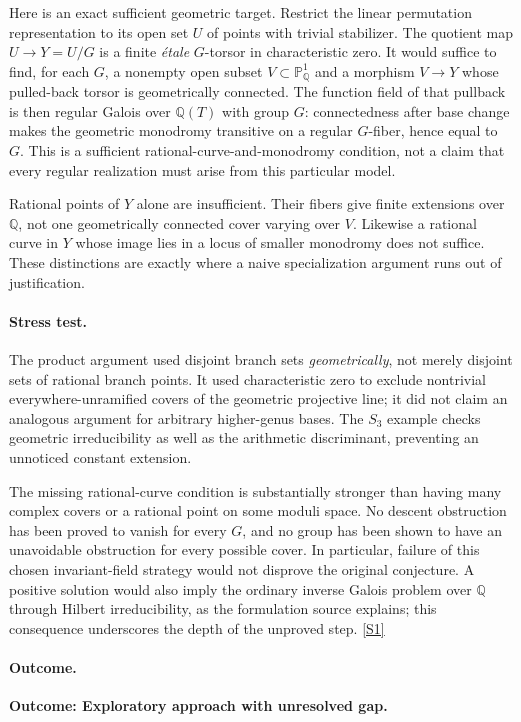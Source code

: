 \documentclass[11pt,a4paper]{article}
\newcommand{\Q}{\mathbb{Q}}
\newcommand{\PP}{\mathbb P}
\newcommand{\sref}[2]{\hyperlink{source:#1:#2}{[S#2]}}
\numberwithin{equation}{section}
\begin{document}
Here is an exact sufficient geometric target.  Restrict the linear
permutation representation to its open set $U$ of points with trivial
stabilizer.  The quotient map $U\to Y=U/G$ is a finite \emph{\'{e}tale}
$G$-torsor in characteristic zero.  It would suffice to find, for each
$G$, a nonempty open subset $V\subset\PP^1_{\Q}$ and a morphism
$V\to Y$ whose pulled-back torsor is geometrically connected.  The
function field of that pullback is then regular Galois over $\Q(T)$
with group $G$: connectedness after base change makes the geometric
monodromy transitive on a regular $G$-fiber, hence equal to $G$.
This is a sufficient rational-curve-and-monodromy condition, not a claim
that every regular realization must arise from this particular model.

Rational points of $Y$ alone are insufficient.  Their fibers give
finite extensions over $\Q$, not one geometrically connected cover
varying over $V$.  Likewise a rational curve in $Y$ whose image lies in
a locus of smaller monodromy does not suffice.  These distinctions are
exactly where a naive specialization argument runs out of justification.

\paragraph{Stress test.}
The product argument used disjoint branch sets \emph{geometrically},
not merely disjoint sets of rational branch points.  It used
characteristic zero to exclude nontrivial everywhere-unramified covers
of the geometric projective line; it did not claim an analogous argument
for arbitrary higher-genus bases.  The $S_3$ example checks geometric
irreducibility as well as the arithmetic discriminant, preventing an
unnoticed constant extension.

The missing rational-curve condition is substantially stronger than
having many complex covers or a rational point on some moduli space.
No descent obstruction has been proved to vanish for every $G$, and no
group has been shown to have an unavoidable obstruction for every possible
cover.  In particular, failure of this chosen invariant-field strategy
would not disprove the original conjecture.  A positive solution would
also imply the ordinary inverse Galois problem over $\Q$ through Hilbert
irreducibility, as the formulation source explains; this consequence
underscores the depth of the unproved step. \sref{120}{1}

\paragraph{Outcome.}
\textbf{Outcome: Exploratory approach with unresolved gap.}
\end{document}
